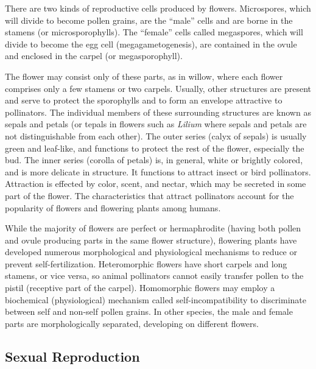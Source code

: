 \documentclass[]{book}
\theoremstyle{definition}
\theoremstyle{definition}
\theoremstyle{definition}
\theoremstyle{remark}
\begin{document}
There are two kinds of reproductive cells produced by flowers.
Microspores, which will divide to become pollen grains, are the ``male''
cells and are borne in the stamens (or microsporophylls). The ``female''
cells called megaspores, which will divide to become the egg cell
(megagametogenesis), are contained in the ovule and enclosed in the
carpel (or megasporophyll).

The flower may consist only of these parts, as in willow, where each
flower comprises only a few stamens or two carpels. Usually, other
structures are present and serve to protect the sporophylls and to form
an envelope attractive to pollinators. The individual members of these
surrounding structures are known as sepals and petals (or tepals in
flowers such as \emph{Lilium} where sepals and petals are not distinguishable
from each other). The outer series (calyx of sepals) is usually green
and leaf-like, and functions to protect the rest of the flower,
especially the bud. The inner series (corolla of petals) is, in general,
white or brightly colored, and is more delicate in structure. It
functions to attract insect or bird pollinators. Attraction is effected
by color, scent, and nectar, which may be secreted in some part of the
flower. The characteristics that attract pollinators account for the
popularity of flowers and flowering plants among humans.

While the majority of flowers are perfect or hermaphrodite (having both
pollen and ovule producing parts in the same flower structure),
flowering plants have developed numerous morphological and physiological
mechanisms to reduce or prevent self-fertilization. Heteromorphic
flowers have short carpels and long stamens, or vice versa, so animal
pollinators cannot easily transfer pollen to the pistil (receptive part
of the carpel). Homomorphic flowers may employ a biochemical
(physiological) mechanism called self-incompatibility to discriminate
between self and non-self pollen grains. In other species, the male and
female parts are morphologically separated, developing on different
flowers.

\subsection{Sexual Reproduction}\label{sexual-reproduction}
\end{document}
